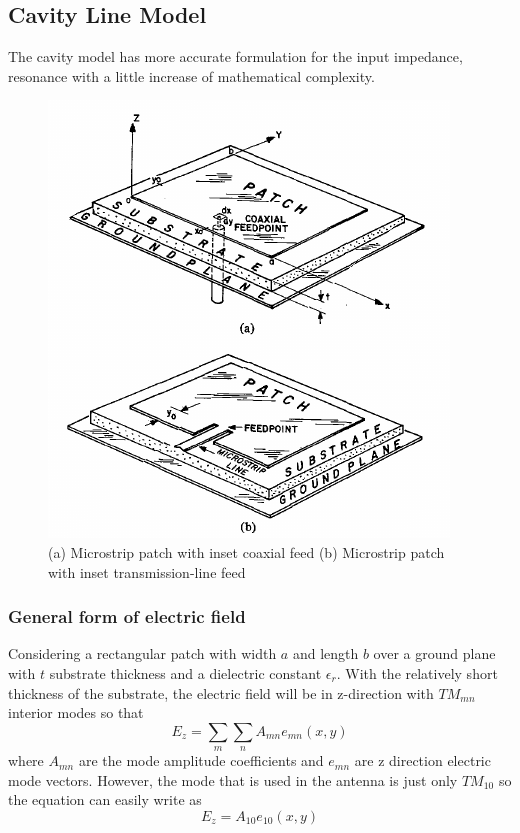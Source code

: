 \documentclass[11pt,a4paper]{article}
\begin{document}
    \subsection{Cavity Line Model}
    \indent The cavity model has more accurate formulation for the input impedance, resonance with a little
            increase of mathematical complexity.\cite{CaM:81}
    \begin{figure}[ht]
      \label{cavitymodel}
      \includegraphics{cavitymodel.png}
      \centering
      \caption{(a) Microstrip patch with inset coaxial feed
               (b) Microstrip patch with inset transmission-line feed
              }
    \end{figure}

      \subsubsection{General form of electric field}
        \indent Considering a rectangular patch with width $a$ and length $b$ over a ground plane with $t$ substrate
                thickness and a dielectric constant $\epsilon_r$. With the relatively short thickness of the substrate,
                the electric field will be in z-direction with $TM_{mn}$ interior modes so that\cite{CaM:81}
        \begin{equation}
          \label{GeneralE}
          E_z = \sum_m\sum_n A_{mn}e_{mn}(x,y)
        \end{equation}
        \indent where $A_{mn}$ are the mode amplitude coefficients and $e_{mn}$ are z direction electric mode vectors.
        \indent However, the mode that is used in the antenna is just only $TM_{10}$ so the equation can easily write as
        \begin{equation}
           E_z = A_{10}e_{10}(x,y)
        \end{equation}
\end{document}
